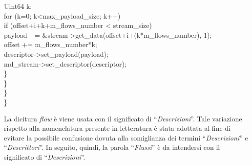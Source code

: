 \begin{code}
				Uint64 k;\\
				for (k=0; k<max\_payload\_size; k++)\\
					if (offset+i+k+m\_flows\_number < stream\_size)\\
						payload += \&stream->get\_data(offset+i+(k*m\_flows\_number), 1);\\
				offset += m\_flows\_number*k;\\
				descriptor->set\_payload(payload);\\
				md\_stream->set\_descriptor(descriptor);\\
			\}\\
		\}\\
	\}\\
\}\\
\end{code}
La dicitura \textit{flow} \`e viene usata con il significato di ``\emph{Descrizioni}''. Tale variazione rispetto alla nomenclatura presente in letteratura \`e stata adottata al fine di evitare la possibile confusione dovuta alla somiglianza dei termini ``\emph{Descrizioni}'' e ``\emph{Descrittori}''. In seguito, quindi, la parola ``\emph{Flussi}'' è da intendersi con il significato di ``\emph{Descrizioni}''.
